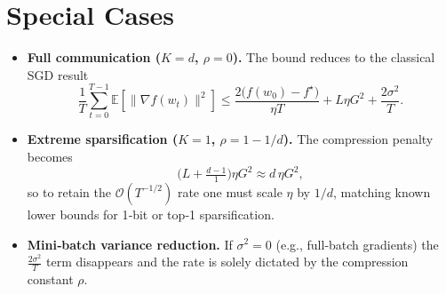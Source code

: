 \documentclass{article}
\newcommand{\E}{\mathbb{E}}
\begin{document}
\section*{Special Cases}
\begin{itemize}
\item \textbf{Full communication ($K=d$, $\rho=0$).}  The bound reduces to the classical SGD result
\[
\frac{1}{T}\sum_{t=0}^{T-1}\E[\|\nabla f(w_t)\|^{2}]
\le \frac{2\bigl(f(w_0)-f^{\star}\bigr)}{\eta T}+L\eta G^{2}+\frac{2\sigma^{2}}{T}.
\]
\item \textbf{Extreme sparsification ($K=1$, $\rho=1-1/d$).}  The compression penalty becomes
\[
\bigl(L+\tfrac{d-1}{1}\bigr)\eta G^{2}\approx d\,\eta G^{2},
\]
so to retain the $\mathcal O(T^{-1/2})$ rate one must scale $\eta$ by $1/d$, matching known lower bounds for 1‑bit or top‑1 sparsification.
\item \textbf{Mini‑batch variance reduction.}  If $\sigma^{2}=0$ (e.g., full‑batch gradients) the $\frac{2\sigma^{2}}{T}$ term disappears and the rate is solely dictated by the compression constant $\rho$.
\end{itemize}
\end{document}
